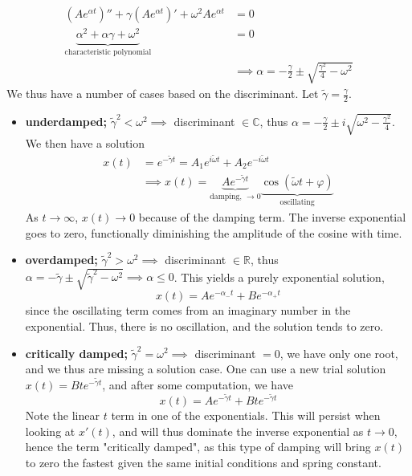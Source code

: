 \documentclass[12pt]{article}
\begin{document}
\begin{align*}
  (Ae^{\alpha t})'' + \gamma (A e^{\alpha t})' + \omega^2Ae^{\alpha t} &= 0\\
  \underbrace{\alpha^2 + \alpha \gamma + \omega^2}_{\text{characteristic polynomial}} &= 0\\
  &\implies \alpha = -\frac{\gamma}{2} \pm \sqrt{\frac{\gamma^2}{4} - \omega^2}
\end{align*}
We thus have a number of cases based on the discriminant. Let $\tilde{\gamma} = \frac{\gamma}{2}$.
\begin{itemize}
  \item \textbf{underdamped; }$\tilde{\gamma}^2 < \omega^2 \implies $ discriminant $\in \mathbb{C}$, thus $\alpha = - \frac{\gamma}{2} \pm i \sqrt{\omega^2 - \frac{\gamma^2}{4}}.$ We then have a solution
  \begin{align*}
    x(t) &= e^{-\tilde{\gamma} t} = A_1 e^{i \tilde{\omega} t} + A_2 e^{-i \tilde{\omega} t}\\
    &\implies \boxed{x(t) = \underbrace{A e^{-\tilde{\gamma}t}}_{\text{damping, } \to 0} \underbrace{\cos(\tilde{\omega}t + \varphi)}_{\text{oscillating}}}
  \end{align*}
   As $t\to \infty$, $x(t)\to 0$ because of the damping term. The inverse exponential goes to zero, functionally diminishing the amplitude of the cosine with time.
  \item \textbf{overdamped; }$\tilde{\gamma}^2 > \omega^2 \implies$ discriminant $\in \mathbb{R}$, thus $\alpha = - \tilde{\gamma} \pm \sqrt{\tilde{\gamma}^2 - \omega^2} \implies \alpha \leq 0$. This yields a purely exponential solution,
  \[\boxed{x(t) = Ae^{-\alpha_-t} + B e^{-\alpha_+ t}}\] since the oscillating term comes from an imaginary number in the exponential. Thus, there is no oscillation, and the solution tends to zero.
  \item \textbf{critically damped; }$\tilde{\gamma}^2 = \omega^2\implies$ discriminant $=0$, we have only one root, and we thus are missing a solution case. One can use a new trial solution $x(t) = B t e^{-\tilde{\gamma}t}$, and after some computation, we have
  \[\boxed{x(t) = Ae^{-\tilde{\gamma}t} +Bte^{-\tilde{\gamma}t}}\] Note the linear $t$ term in one of the exponentials. This will persist when looking at $x'(t)$, and will thus dominate the inverse exponential as $t \to 0$, hence the term "critically damped", as this type of damping will bring $x(t)$ to zero the fastest given the same initial conditions and spring constant.
\end{itemize}
\end{document}
